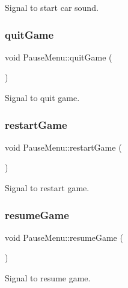 Signal to start car sound. 

\mbox{\label{class_pause_menu_a1db9704223355ed9ea8fa011d6c669ed}} 
\subsubsection{\texorpdfstring{quitGame}{quitGame}}
{\footnotesize\ttfamily void Pause\+Menu\+::quit\+Game (\begin{DoxyParamCaption}{ }\end{DoxyParamCaption})\hspace{0.3cm}{\ttfamily [signal]}}



Signal to quit game. 

\mbox{\label{class_pause_menu_a0e589c9e7ac92ad7a9478b100f2b94c1}} 
\subsubsection{\texorpdfstring{restartGame}{restartGame}}
{\footnotesize\ttfamily void Pause\+Menu\+::restart\+Game (\begin{DoxyParamCaption}{ }\end{DoxyParamCaption})\hspace{0.3cm}{\ttfamily [signal]}}



Signal to restart game. 

\mbox{\label{class_pause_menu_a294b2f57ecba7ee42a871f1c6ed614eb}} 
\subsubsection{\texorpdfstring{resumeGame}{resumeGame}}
{\footnotesize\ttfamily void Pause\+Menu\+::resume\+Game (\begin{DoxyParamCaption}{ }\end{DoxyParamCaption})\hspace{0.3cm}{\ttfamily [signal]}}



Signal to resume game. 

